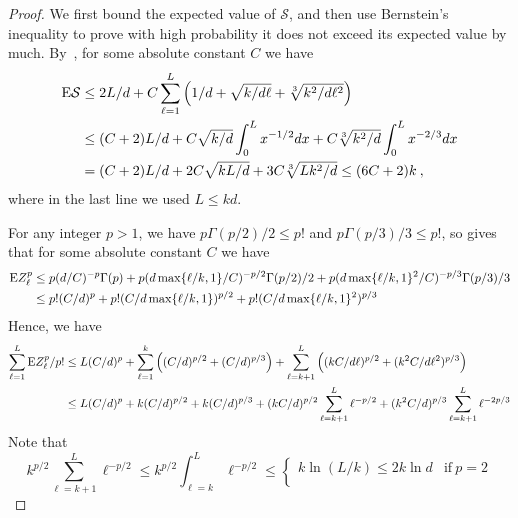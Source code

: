 \documentclass{patmorin}
\begin{document}
\begin{proof}
We first bound the expected value of $\mathcal S$, and then use Bernstein's inequality to prove with high probability it does not exceed its expected value by much.
By~, for some absolute constant $C$  we have
\begin{align*}
\mathrm{E} \mathcal S
& \leq 2L/d + C \sum_{\ell=1}^{L} 
\left(1/d + 
\sqrt{k/d\ell}
+ \sqrt[3]{k^2/d\ell^2}\right) \\
& \leq
(C+2)L/d
+
C\sqrt{k/d}\int_{0}^{L}x^{-1/2}dx
+
C\sqrt[3]{k^2/d}\int_0^{L}x^{-2/3}dx\\
&=
(C+2)L/d
+
2C\sqrt{kL/d}
+3C\sqrt[3]{Lk^2/d}
\leq
(6C+2)k\:,
\end{align*}
where in the last line we used $L\leq kd$.

For any integer $p>1$, we have $p\Gamma(p/2)/2\leq p!$ and $p\Gamma(p/3)/3\leq p!$, so
 gives that for some absolute constant $C$  we have
\begin{align*}
\mathrm{E} Z_{\ell}^p & \leq
 p (d/C)^{-p}\Gamma(p)
+ p(d\max\{\ell/k,1\}/C)^{-p/2}\Gamma(p/2)/2
+ p(d\max\{\ell/k,1\}^2/C)^{-p/3}\Gamma(p/3)/3\\
&\leq
 p! (C/d)^{p}
+ p!(C/d\max\{\ell/k,1\})^{p/2}
+ p!(C/d\max\{\ell/k,1\}^2)^{p/3}
\end{align*}
Hence, we have
\begin{align*}
\sum_{\ell=1}^{L} \mathrm{E} Z_{\ell}^p / p!
& \leq
L (C/d)^{p}
+
\sum_{\ell=1}^{k}
\left( (C/d)^{p/2}
+ (C/d)^{p/3} \right)
+
\sum_{\ell=k+1}^{L}
\left( (kC/d\ell)^{p/2}
+ (k^2C/d\ell^2)^{p/3} \right)\\
&
\leq L (C/d)^{p}
+
k (C/d)^{p/2}
+ k(C/d)^{p/3} 
+
(kC/d)^{p/2}
\sum_{\ell=k+1}^{L}
\ell^{-p/2}
+
 (k^2C/d)^{p/3}
\sum_{\ell=k+1}^{L}
\ell^{-2p/3}
\end{align*}
Note that 
\[k^{p/2}\sum_{\ell=k+1}^{L}\ell^{-p/2} \leq 
k^{p/2}\int_{\ell=k}^{L}\ell^{-p/2} 
\leq \begin{cases}
 k \ln (L/k) \leq 2 k \ln d & \mathrm{if\ } p=2 \\

\end{cases}\]
\end{proof}
\end{document}
